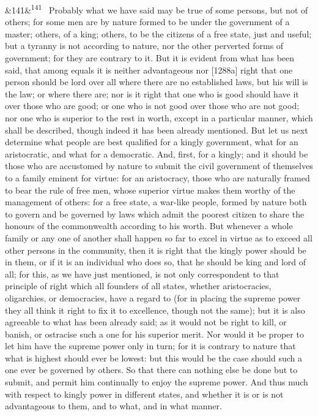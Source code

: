\documentclass[12pt]{article}
\newcommand{\para}[1][]{\par\noindent\ifx&#1&\else\textsuperscript{\footnotesize #1}~\fi}
\begin{document}
\para[141] Probably what we have said may be true of some persons, but not of others; for some men are by nature formed to be under the government of a master; others, of a king; others, to be the citizens of a free state, just and useful; but a tyranny is not according to nature, nor the other perverted forms of government; for they are contrary to it. But it is evident from what has been said, that among equals it is neither advantageous nor [1288a] right that one person should be lord over all where there are no established laws, but his will is the law; or where there are; nor is it right that one who is good should have it over those who are good; or one who is not good over those who are not good; nor one who is superior to the rest in worth, except in a particular manner, which shall be described, though indeed it has been already mentioned. But let us next determine what people are best qualified for a kingly government, what for an aristocratic, and what for a democratic. And, first, for a kingly; and it should be those who are accustomed by nature to submit the civil government of themselves to a family eminent for virtue: for an aristocracy, those who are naturally framed to bear the rule of free men, whose superior virtue makes them worthy of the management of others: for a free state, a war-like people, formed by nature both to govern and be governed by laws which admit the poorest citizen to share the honours of the commonwealth according to his worth. But whenever a whole family or any one of another shall happen so far to excel in virtue as to exceed all other persons in the community, then it is right that the kingly power should be in them, or if it is an individual who does so, that he should be king and lord of all; for this, as we have just mentioned, is not only correspondent to that principle of right which all founders of all states, whether aristocracies, oligarchies, or democracies, have a regard to (for in placing the supreme power they all think it right to fix it to excellence, though not the same); but it is also agreeable to what has been already said; as it would not be right to kill, or banish, or ostracise such a one for his superior merit. Nor would it be proper to let him have the supreme power only in turn; for it is contrary to nature that what is highest should ever be lowest: but this would be the case should such a one ever be governed by others. So that there can nothing else be done but to submit, and permit him continually to enjoy the supreme power. And thus much with respect to kingly power in different states, and whether it is or is not advantageous to them, and to what, and in what manner.
\end{document}
